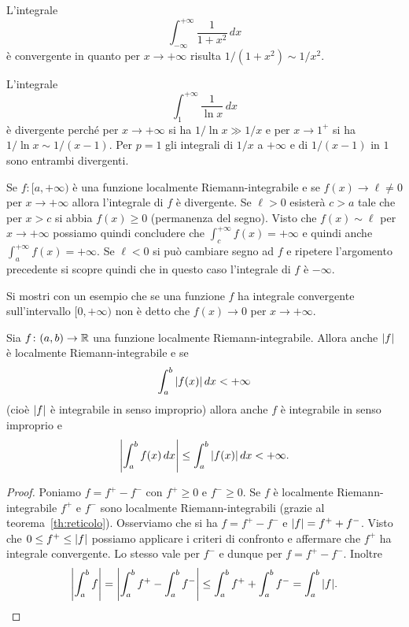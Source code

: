 \begin{example}
L'integrale
\[
  \int_{-\infty}^{+\infty}\frac{1}{1+x^2}\, dx
\]
è convergente in quanto per $x\to +\infty$ risulta $1/(1+x^2) \sim 1/x^2$.

L'integrale
\[
  \int_1^{+\infty} \frac{1}{\ln x}\, dx
\]
è divergente perché per $x\to +\infty$
si ha $1/\ln x \gg 1/x$ e per $x\to 1^+$ si ha
$1/\ln x \sim 1/(x-1)$. Per $p=1$ gli integrali
di $1/x$ a $+\infty$ e di $1/(x-1)$ in $1$
sono entrambi divergenti.

Se $f\colon [a,+\infty)$ è una funzione localmente Riemann-integrabile
e se $f(x)\to \ell \neq 0$ per $x\to +\infty$ allora l'integrale
di $f$ è divergente. Se $\ell>0$ esisterà $c>a$ tale che per $x>c$
si abbia $f(x)\ge 0$ (permanenza del segno). Visto che
$f(x)\sim \ell$ per $x\to +\infty$ possiamo quindi concludere
che $\int_c^{+\infty} f(x) = +\infty$ e
quindi anche
$\int_a^{+\infty} f(x) = +\infty$.
Se $\ell<0$ si può cambiare segno ad $f$ e ripetere l'argomento precedente
si scopre quindi che in questo caso l'integrale di $f$ è $-\infty$.
\end{example}

\begin{exercise}
Si mostri con un esempio che se una funzione $f$ ha integrale
convergente sull'intervallo $[0,+\infty)$ non
è detto che $f(x)\to 0$ per $x\to +\infty$.
\end{exercise}


\begin{theorem}
\label{th:convergenza_assoluta_integrale}
\mymark{**}%
Sia $f\colon (a,b)\to {\mathbb R}$ una funzione localmente Riemann-integrabile.
Allora anche ${\left|f\right|}$ è localmente Riemann-integrabile e se
\[
\int_a^b {\left|f(x)\right|}\, dx < +\infty
\]
(cioè ${\left|f\right|}$ è integrabile in senso improprio)
allora anche $f$ è integrabile in senso improprio e
\[
  {\left|\int_a^b f(x)\,dx\right|}
  \le \int_a^b {\left|f(x)\right|}\, dx < +\infty.
\]
\end{theorem}
%
%
\begin{proof}
Poniamo $f = f^+ - f^-$ con $f^+\ge 0$ e $f^-\ge 0$.
Se $f$ è localmente Riemann-integrabile
$f^+$ e $f^-$ sono localmente Riemann-integrabili
(grazie al teorema~\ref{th:reticolo}).
Osserviamo che si ha $f = f^+ - f^-$
e ${\left|f\right|} = f^+ + f^-$.
Visto che $0\le f^+ \le {\left|f\right|}$ possiamo
applicare i criteri di confronto e
affermare che $f^+$ ha integrale convergente.
Lo stesso vale per $f^-$ e dunque per $f=f^+ - f^-$.
Inoltre
\[
  {\left|\int_a^b f \right|}
  = {\left|\int_a^b f^+ - \int_a^b f^-\right|}
  \le \int_a^b f^+ + \int_a^b f^-
  = \int_a^b {\left|f\right|}.
\]
\end{proof}

